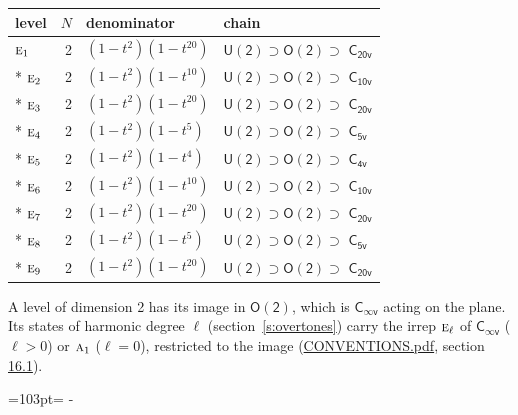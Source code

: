 \documentclass[10pt,a4paper]{article}
\newcommand{\needspace}[1]{\par\penalty-100\begingroup\dimen0=#1\relax\dimen2=\pagegoal
  \advance\dimen2-\pagetotal\ifdim\dimen0>\dimen2\relax\ifdim\dimen2>0pt\vfil\break\fi\fi
  \endgroup}
\numberwithin{equation}{section}
\newcommand{\grp}[1]{\mathsf{#1}}
\newcommand{\irr}[1]{\text{\normalfont\scshape #1}}
\begin{document}
{\small\begin{longtable}{@{}lrll@{}}\toprule
level & $N$ & denominator & chain\\\midrule\endhead
\bottomrule\endfoot\endlastfoot
$\irr{e}_{1}$ & 2 & $(1-t^{2})(1-t^{20})$ & $\grp{U(2)} \supset \grp{O(2)} \supset$ $\grp{C_{20v}}$\\*
$\irr{e}_{2}$ & 2 & $(1-t^{2})(1-t^{10})$ & $\grp{U(2)} \supset \grp{O(2)} \supset$ \href{C10v.pdf}{$\grp{C_{10v}}$}\\*
$\irr{e}_{3}$ & 2 & $(1-t^{2})(1-t^{20})$ & $\grp{U(2)} \supset \grp{O(2)} \supset$ $\grp{C_{20v}}$\\*
$\irr{e}_{4}$ & 2 & $(1-t^{2})(1-t^{5})$ & $\grp{U(2)} \supset \grp{O(2)} \supset$ \href{C5v.pdf}{$\grp{C_{5v}}$}\\*
$\irr{e}_{5}$ & 2 & $(1-t^{2})(1-t^{4})$ & $\grp{U(2)} \supset \grp{O(2)} \supset$ \href{C4v.pdf}{$\grp{C_{4v}}$}\\*
$\irr{e}_{6}$ & 2 & $(1-t^{2})(1-t^{10})$ & $\grp{U(2)} \supset \grp{O(2)} \supset$ \href{C10v.pdf}{$\grp{C_{10v}}$}\\*
$\irr{e}_{7}$ & 2 & $(1-t^{2})(1-t^{20})$ & $\grp{U(2)} \supset \grp{O(2)} \supset$ $\grp{C_{20v}}$\\*
$\irr{e}_{8}$ & 2 & $(1-t^{2})(1-t^{5})$ & $\grp{U(2)} \supset \grp{O(2)} \supset$ \href{C5v.pdf}{$\grp{C_{5v}}$}\\*
$\irr{e}_{9}$ & 2 & $(1-t^{2})(1-t^{20})$ & $\grp{U(2)} \supset \grp{O(2)} \supset$ $\grp{C_{20v}}$\\
\bottomrule\end{longtable}}
A level of dimension 2 has its image in $\grp{O(2)}$, which is \href{Cinfv.pdf}{$\grp{C_{\infty v}}$} acting on the plane. \label{n:index.harmonic.degree}Its states of harmonic degree $\ell$ (section~\ref{s:overtones}) carry the irrep $\irr{e}_{\ell}$ of \href{Cinfv.pdf}{$\grp{C_{\infty v}}$} ($\ell > 0$) or $\irr{a}_{1}$ ($\ell = 0$), restricted to the image (\href{../../CONVENTIONS.pdf}{CONVENTIONS.pdf}, section \href{../../CONVENTIONS.pdf\#conv.16.1}{16.1}).
\needspace{103pt}
\end{document}
